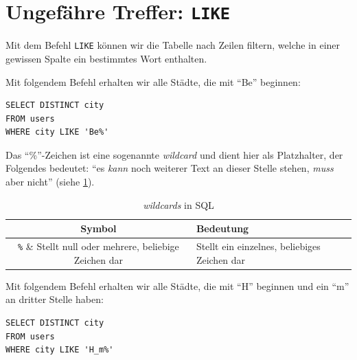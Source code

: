 \section{Ungefähre Treffer: \texorpdfstring{\lstinline|LIKE|}{LIKE}}

Mit dem Befehl \lstinline|LIKE| können wir die Tabelle nach Zeilen filtern, welche in einer gewissen Spalte ein bestimmtes Wort enthalten.

\begin{myexample}
Mit folgendem Befehl erhalten wir alle Städte, die mit \enquote{Be} beginnen:

\begin{lstlisting}
SELECT DISTINCT city
FROM users
WHERE city LIKE 'Be%'
\end{lstlisting}
\end{myexample}

Das \enquote{\%}-Zeichen ist eine sogenannte \textit{wildcard} und dient hier als Platzhalter, der Folgendes bedeutet: \enquote{es \textit{kann} noch weiterer Text an dieser Stelle stehen, \textit{muss} aber nicht} (siehe \cref{table:wildcards}).

\begin{table}[ht]
  \centering
  \begin{tabular}{cl}
    \textbf{Symbol}            & \textbf{Bedeutung}                              \\ \midrule
    \lstinline|%| & Stellt null oder mehrere, beliebige Zeichen dar \\
    \lstinline|_| & Stellt ein einzelnes, beliebiges Zeichen dar    \\
  \end{tabular}
  \caption{\textit{wildcards} in \gls{SQL}}
  \label{table:wildcards}
\end{table}

\begin{myexample}
Mit folgendem Befehl erhalten wir alle Städte, die mit \enquote{H} beginnen und ein \enquote{m} an dritter Stelle haben:

\begin{lstlisting}
SELECT DISTINCT city
FROM users
WHERE city LIKE 'H_m%'
\end{lstlisting}
\end{myexample}



